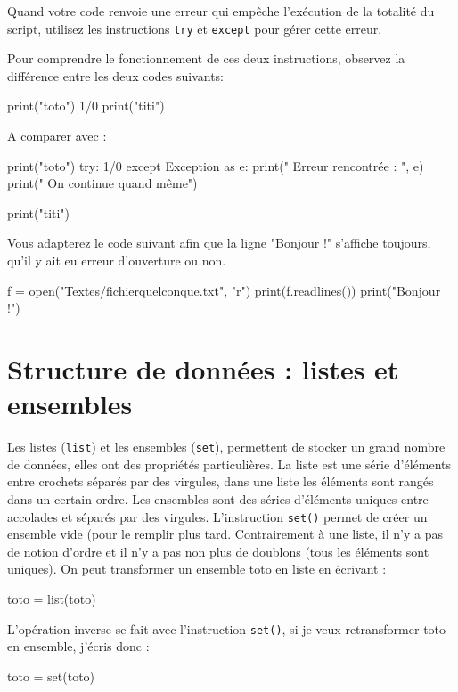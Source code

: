 Quand votre code renvoie une erreur qui empêche l'exécution de la totalité du script, utilisez les instructions \texttt{try} et \texttt{except} pour gérer cette erreur.

Pour comprendre le fonctionnement de ces deux instructions, observez la différence entre les deux codes suivants:

\begin{python}
print("toto")
1/0
print("titi")
\end{python}

A comparer avec :
\begin{python}
print("toto")
try:
  1/0
except Exception as e:
  print(" Erreur rencontrée : ", e)
  print(" On continue quand même")

print("titi")
\end{python}

Vous adapterez le code suivant afin que la ligne "Bonjour !" s'affiche toujours, qu'il y ait eu erreur d'ouverture ou non.

\begin{python}
f = open("Textes/fichierquelconque.txt", "r")
print(f.readlines())
print("Bonjour !")
\end{python}

\section{Structure de données : listes et ensembles}%

Les listes (\texttt{list}) et les ensembles (\texttt{set}), permettent de stocker un grand nombre de données, elles ont des propriétés particulières. La liste est une série d'éléments entre crochets séparés par des virgules, dans une liste les éléments sont rangés dans un certain ordre. Les ensembles sont des séries d'éléments uniques entre accolades et séparés par des virgules. L'instruction \texttt{set()} permet de créer un ensemble vide (pour le remplir plus tard. Contrairement à une liste, il n'y a pas de notion d'ordre et il n'y a pas non plus de doublons (tous les éléments sont uniques). On peut transformer un ensemble toto en liste en écrivant :
\begin{python}
toto = list(toto)
\end{python}

L'opération inverse se fait avec l'instruction \texttt{set()}, si je veux retransformer toto en ensemble, j'écris donc  :

\begin{python}
toto = set(toto)
\end{python}


